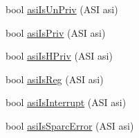 \begin{DoxyCompactItemize}
\item 
bool \hyperlink{namespaceSparcISA_a36fc5916dec11c97ac8e2c55a2faec03}{asiIsUnPriv} (ASI asi)
\item 
bool \hyperlink{namespaceSparcISA_a3a9876c54c59d03a54683c9c9f0215a0}{asiIsPriv} (ASI asi)
\item 
bool \hyperlink{namespaceSparcISA_a555f3112a89b6856275a44365d2ebd26}{asiIsHPriv} (ASI asi)
\item 
bool \hyperlink{namespaceSparcISA_af33254f1d08f51f2f8a81902c1c4cc53}{asiIsReg} (ASI asi)
\item 
bool \hyperlink{namespaceSparcISA_a9ae7d061a2e4abcab3fbc6240ff2dbe5}{asiIsInterrupt} (ASI asi)
\item 
bool \hyperlink{namespaceSparcISA_ae656441d838f9206db0f8c80b0fea60c}{asiIsSparcError} (ASI asi)
\end{DoxyCompactItemize}

